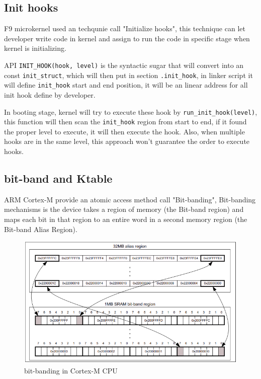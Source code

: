 \documentclass[10pt,preprint,nocopyrightspace]{sigplanconf}
\begin{document}
\subsection{Init hooks}

F9 microkernel used an techqunie call "Initialize hooks", this technique can let developer write code in kernel and assign to run the code in specific stage when kernel is initializing.

API \verb|INIT_HOOK(hook, level)| is the syntactic sugar that will convert into an const \verb|init_struct|, which will then put in section \verb|.init_hook|, in linker script it will define \verb|init_hook| start and end position, it will be an linear address for all init hook define by developer.

In booting stage, kernel will try to execute these hook by \verb|run_init_hook(level)|, this function will then scan the \verb|init_hook| region from start to end, if it found the proper level to execute, it will then execute the hook. Also, when multiple hooks are in the same level, this approach won't guarantee the order to execute hooks.

\subsection{bit-band and Ktable}
ARM Cortex-M provide an atomic access method call "Bit-banding", Bit-banding mechanisms is the device takes a region of memory (the Bit-band region) and maps each bit in that region to an entire word in a second memory region (the Bit-band Alias Region).\cite{schaenzle2013}

\begin{figure}[H]
\begin{center}
	\includegraphics[width=\linewidth]{picture/bit-banding.png}
\end{center}
\caption{bit-banding in Cortex-M CPU\cite{st2016manual}}
\end{figure}
\end{document}

